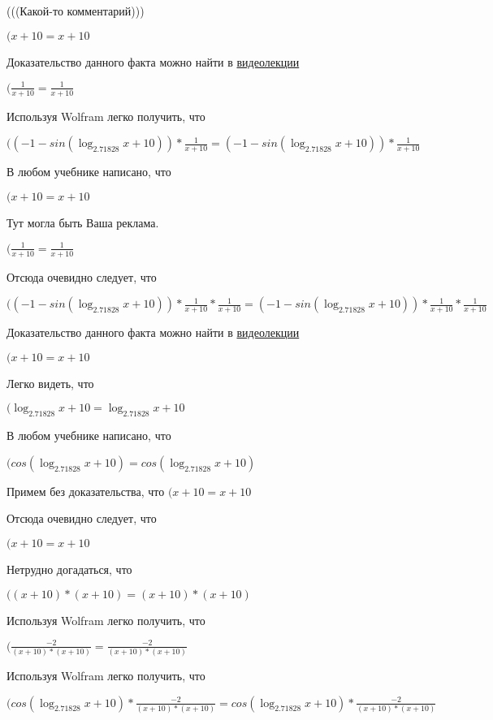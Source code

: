 \documentclass[12pt,a4paper,fleqn]{article}
\theoremstyle{definition}
\begin{document}
(((Какой-то комментарий)))

$( x  +  10  =  x  +  10 $

Доказательство данного факта можно найти в \href{https://www.youtube.com/watch?v=dQw4w9WgXcQ}{видеолекции}

$(\frac{ 1 }{ x  +  10 }
 = \frac{ 1 }{ x  +  10 }
$

Используя Wolfram легко получить, что

$(( -1  - sin(\log_{ 2.71828 }{ x  +  10 })) * \frac{ 1 }{ x  +  10 }
 = ( -1  - sin(\log_{ 2.71828 }{ x  +  10 })) * \frac{ 1 }{ x  +  10 }
$

В любом учебнике написано, что

$( x  +  10  =  x  +  10 $

Тут могла быть Ваша реклама.

$(\frac{ 1 }{ x  +  10 }
 = \frac{ 1 }{ x  +  10 }
$

Отсюда очевидно следует, что

$(( -1  - sin(\log_{ 2.71828 }{ x  +  10 })) * \frac{ 1 }{ x  +  10 }
 * \frac{ 1 }{ x  +  10 }
 = ( -1  - sin(\log_{ 2.71828 }{ x  +  10 })) * \frac{ 1 }{ x  +  10 }
 * \frac{ 1 }{ x  +  10 }
$

Доказательство данного факта можно найти в \href{https://www.youtube.com/watch?v=dQw4w9WgXcQ}{видеолекции}

$( x  +  10  =  x  +  10 $

Легко видеть, что

$(\log_{ 2.71828 }{ x  +  10 } = \log_{ 2.71828 }{ x  +  10 }$

В любом учебнике написано, что

$(cos(\log_{ 2.71828 }{ x  +  10 }) = cos(\log_{ 2.71828 }{ x  +  10 })$

Примем без доказательства, что
$( x  +  10  =  x  +  10 $

Отсюда очевидно следует, что

$( x  +  10  =  x  +  10 $

Нетрудно догадаться, что

$(( x  +  10 ) * ( x  +  10 ) = ( x  +  10 ) * ( x  +  10 )$

Используя Wolfram легко получить, что

$(\frac{ -2 }{( x  +  10 ) * ( x  +  10 )}
 = \frac{ -2 }{( x  +  10 ) * ( x  +  10 )}
$

Используя Wolfram легко получить, что

$(cos(\log_{ 2.71828 }{ x  +  10 }) * \frac{ -2 }{( x  +  10 ) * ( x  +  10 )}
 = cos(\log_{ 2.71828 }{ x  +  10 }) * \frac{ -2 }{( x  +  10 ) * ( x  +  10 )}
$
\end{document}
